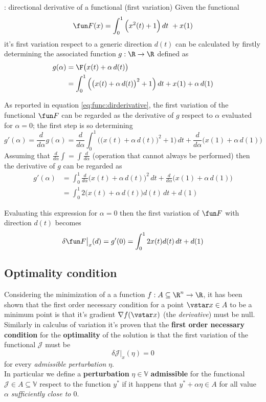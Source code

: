 \begin{example}{: directional derivative of a functional (first variation)}
	Given the functional
	\[ \fun F(x) = \int_0^1 \Big(x^2(t) + 1\Big) \, dt  \ + x(1) \]
	it's first variation respect to a generic direction $d(t)$ can be calculated by firstly determining the associated function $g:\R\rightarrow \R$ defined as
	\begin{align*}
		g(\alpha) &  = \F\big(x(t) + \alpha\, d(t)\big) \\
		& = \int_0^1 \Big( \big(x(t) + \alpha\, d(t)\big)^2 + 1 \Big)\, dt  + x(1) + \alpha\, d(1)
	\end{align*}
	
	As reported in equation \ref{eq:func:dirderivative}, the first variation of the functional $\fun F$ can be regarded as the derivative of $g$ respect to $\alpha$ evaluated for $\alpha = 0$; the first step is so determining
	\[ g'(\alpha ) = \frac{d}{d\alpha}g(\alpha) = \frac d{d\alpha } \int_0^1 \Big( \big(x(t) + \alpha\, d(t)\big)^2 + 1 \Big)\, dt  +  \frac d{d\alpha} \Big(x(1) + \alpha\, d(1)\Big) \]		
	Assuming that $\frac d{d\alpha}\int = \int \frac d{d\alpha}$ (operation that cannot always be performed) then the derivative of $g$ can be regarded as
	\begin{align*}
		g'(\alpha) &= \int_0^1 \frac d{d\alpha} \Big(x(t) + \alpha\, d(t)\Big)^2\, dt + \frac d{d\alpha} \Big(x(1) + \alpha \, d(1)\Big) \\
		& = \int_0^1 2\big(x(t) + \alpha\, d(t)\big) d(t)\, dt + d(1) 
	\end{align*}
	
	Evaluating this expression for $\alpha = 0$ then the first variation of $\fun F$ with direction $d(t)$ becomes
	\[ \delta \fun F\big|_x(d) = g'(0) = \int_0^1 2x(t)d(t)\, dt + d(1) \]
\end{example}

\subsection{Optimality condition}
Considering the minimization of a a function $f:A\subseteq \R^n\rightarrow \R$, it has been shown that the first order necessary condition for a point $\vstar x \in A$ to be a minimum point is that it's gradient $\nabla f(\vstar x)$ (the \textit{derivative}) must be null. Similarly in calculus of variation it's proven that the \textbf{first order necessary condition} for the \textbf{optimality} of the solution is that the first variation of the functional $\mathcal J$ must be 
\begin{equation}
	\delta \mathcal J\big|_x(\eta)= 0
\end{equation}
for every \textit{admissible perturbation} $\eta$. \\ In particular we define a \textbf{perturbation} $\eta \in \mathds V$ \textbf{admissible} for the functional $\mathcal J \in A\subseteq \mathds V$ respect to the function $y^*$ if it happens that $y^* + \alpha \eta \in A$ for all value $\alpha$ \textit{sufficiently close to $0$}.


